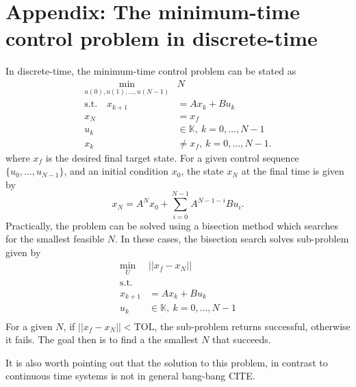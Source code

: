 \documentclass[journal,twocolumn,twoside]{IEEEtran}
\begin{document}
\section*{Appendix: The minimum-time control problem in discrete-time}\label{sec:mintime}
In discrete-time, the minimum-time control problem can be stated as \cite{chen_minimumtime_cca}
\begin{align}
\min_{u(0), u(1),\dots,u(N-1)} & N\\
\text{s.t.}\quad
x_{k+1} & = Ax_{k} + Bu_{k}\\
x_{N} & = x_{f}\\
u_{k}&\in \mathds{K},~k=0,\dots,N-1\\
x_{k} &\neq x_{f},~k=0,\dots,N-1.
\end{align}
where $x_f$ is the desired final target state. 
For a given control sequence $\{u_0,\dots, u_{N-1}\}$, and an initial condition $x_0$, the state $x_N$ at the final time is given by
\begin{equation}
x_N = A^Nx_0 + \sum_{i=0}^{N-1}A^{N-1-i}Bu_i.
\end{equation}
Practically, the problem can be solved using a bisection method which searches for the smallest feasible \(N\). In these cases, the bisection search solves sub-problem given by
\begin{align}
\min_{U}& || x_{f} - x_{N}||\\
\text{s.t.} &\\
x_{k+1} & = Ax_{k} + Bu_{k}\\
u_{k}&\in \mathds{K},~k=0,\dots,N-1\\
\end{align}
For a given \(N\), if \(||x_{f} - x_{N}|| < \text{TOL}\), the sub-problem returns successful, otherwise it fails. The goal then is to find a the smallest \(N\) that succeeds. 

It is also worth pointing out that the solution to this problem, in contrast to continuous time systems is not in general bang-bang CITE.
\end{document}
